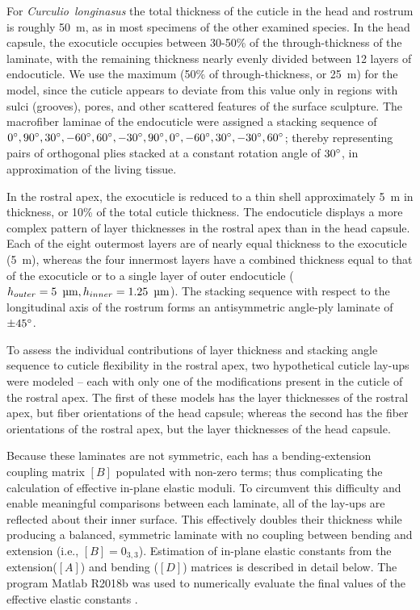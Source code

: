 \documentclass[twocolumn, linenumbers, superscriptaddress, nofootinbib]{revtex4-1}
\begin{document}
				For \textit{Curculio~longinasus} the total thickness of the cuticle in the head and rostrum is roughly 50 \,{\textmu}m, as in most specimens of the other examined species.
				In the head capsule, the exocuticle occupies between 30-50\% of the through-thickness of the laminate, with the remaining thickness nearly evenly divided between 12 layers of endocuticle.
				We use the maximum (50\% of through-thickness, or 25 \,{\textmu}m) for the model, since the cuticle appears to deviate from this value only in regions with sulci (grooves), pores, and other scattered features of the surface sculpture.
				The macrofiber laminae of the endocuticle were assigned a stacking sequence of $0\degree, 90\degree, 30\degree, -60\degree, 60\degree, -30\degree, 90\degree, 0\degree, -60\degree, 30\degree, -30\degree, 60\degree$; thereby representing pairs of orthogonal plies stacked at a constant rotation angle of $30\degree$, in approximation of the living tissue.
				
				In the rostral apex, the exocuticle is reduced to a thin shell approximately 5 \,{\textmu}m in thickness, or 10\% of the total cuticle thickness.
				The endocuticle displays a more complex pattern of layer thicknesses in the rostral apex than in the head capsule.
				Each of the eight outermost layers are of nearly equal thickness to the exocuticle (5 \,{\textmu}m), whereas the four innermost layers have a combined thickness equal to that of the exocuticle or to a single layer of outer endocuticle ($h_{outer}=5~\,\text{{\textmu}m}, h_{inner}=1.25~\,\text{{\textmu}m}$).
				The stacking sequence with respect to the longitudinal axis of the rostrum forms an antisymmetric angle-ply laminate of $\pm45\degree$.
				
				To assess the individual contributions of layer thickness and stacking angle sequence to cuticle flexibility in the rostral apex, two hypothetical cuticle lay-ups were modeled -- each with only one of the modifications present in the cuticle of the rostral apex.
				The first of these models has the layer thicknesses of the rostral apex, but fiber orientations of the head capsule; whereas the second has the fiber orientations of the rostral apex, but the layer thicknesses of the head capsule.
				
				Because these laminates are not symmetric, each has a bending-extension coupling matrix $[B]$ populated with non-zero terms; thus complicating the calculation of effective in-plane elastic moduli.
				To circumvent this difficulty and enable meaningful comparisons between each laminate, all of the lay-ups are reflected about their inner surface.
				This effectively doubles their thickness while producing a balanced, symmetric laminate with no coupling between bending and extension (i.e., $[B]=0_{3,3}$).
				Estimation of in-plane elastic constants from the extension($[A]$) and bending ($[D]$) matrices is described in detail below.
				The program Matlab R2018b was used to numerically evaluate the final values of the effective elastic constants \cite{Matlab}.
				
\end{document}
